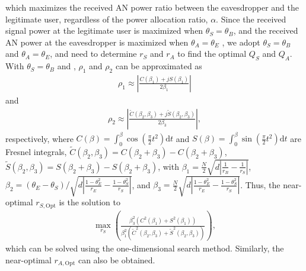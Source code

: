 \documentclass[10pt,technote]{IEEEtran}
\newcommand{\1}{\mathbbm{1}}
\begin{document}
which maximizes the received AN power ratio between the eavesdropper and the legitimate user, regardless of the power allocation ratio, $\alpha$. Since the received signal power at the legitimate user is maximized when $\theta_S = \theta_B$, and the received AN power at the eavesdropper is maximized when $\theta_A = \theta_E$ \cite[\textbf{Proposition 1}]{zhang2024performanceanalysislowcomplexitybeamforming}, we adopt $\theta_S = \theta_B$ and $\theta_A = \theta_E$, and need to determine $r_S$ and $r_A$ to find the optimal $Q_S$ and $Q_A$. %
With $\theta_S = \theta_B$ and \cite[\textbf{Lemma 1}]{Chen2023wcl}, $\rho_1$ and $\rho_2$ can be approximated as
\begin{align}
\rho_1 \approx \left|\frac{C(\beta_1)+j S(\beta_1)}{2\beta_1}\right|
\end{align}
and
\begin{align}
\rho_2 \approx \left|\frac{\tilde{C}(\beta_2,\beta_3)+j \tilde{S}(\beta_2,\beta_3)}{2\beta_3}\right|,
\end{align}
respectively, where $C(\beta) = \int_0^{\beta}\cos\left(\frac{\pi}{2}t^2\right)\mathrm{d}t$ and $S(\beta) = \int_0^{\beta}\sin\left(\frac{\pi}{2}t^2\right)\mathrm{d}t$ are Fresnel integrals, $\tilde{C}(\beta_2,\beta_3) = C(\beta_2+\beta_3)-C(\beta_2+\beta_3)$, $\tilde{S}(\beta_2,\beta_3) = S(\beta_2+\beta_3)-S(\beta_2+\beta_3)$, with $\beta_1 = \frac{N}{2}\sqrt{d\left|\frac{1}{r_B}-\frac{1}{r_S}\right|}$, $\beta_2 = \left(\theta_E-\theta_S\right)/\sqrt{d\left|\frac{1-\theta_E^2}{r_E}-\frac{1-\theta_S^2}{r_S}\right|}$, and $\beta_3 = \frac{N}{2}\sqrt{d\left|\frac{1-\theta_E^2}{r_E}-\frac{1-\theta_S^2}{r_S}\right|}$.
Thus, the near-optimal $r_{S,\textrm{Opt}}$ is the solution to
\begin{align}
\max_{{r_S}}\left(\frac{\beta_3^2(C^2(\beta_1)+S^2(\beta_1))}{\beta_1^2(\tilde{C}^2(\beta_2,\beta_3)+ \tilde{S}^2(\beta_2,\beta_3))}\right),
\end{align}
which can be solved using the one-dimensional search method. Similarly, the near-optimal $r_{A,\textrm{Opt}}$ can also be obtained.
\end{document}
